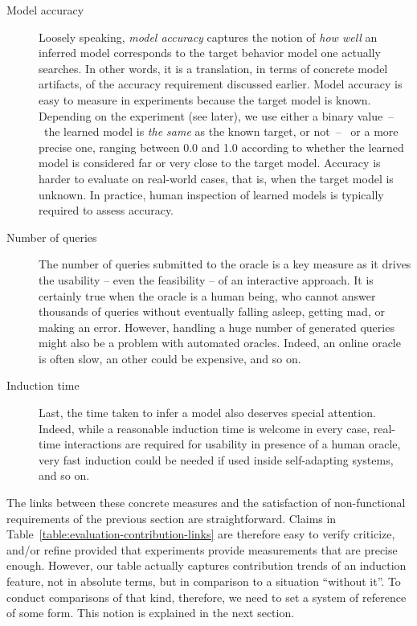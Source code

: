 \begin{description}

\item[Model accuracy] Loosely speaking, \emph{model accuracy} captures the notion of \emph{how well} an inferred model corresponds to the target behavior model one actually searches. In other words, it is a translation, in terms of concrete model artifacts, of the accuracy requirement discussed earlier. Model accuracy is easy to measure in experiments because the target model is known. Depending on the experiment (see later), we use either a binary value~--~the learned model is \emph{the same} as the known target, or not~--~ or a more precise one, ranging between 0.0 and 1.0 according to whether the learned model is considered far or very close to the target model. Accuracy is harder to evaluate on real-world cases, that is, when the target model is unknown. In practice, human inspection of learned models is typically required to assess accuracy.

\item[Number of queries] The number of queries submitted to the oracle is a key measure as it drives the usability -- even the feasibility -- of an interactive approach. It is certainly true when the oracle is a human being, who cannot answer thousands of queries without eventually falling asleep, getting mad, or making an error. However, handling a huge number of generated queries might also be a problem with automated oracles. Indeed, an online oracle is often slow, an other could be expensive, and so on.

\item[Induction time] Last, the time taken to infer a model also deserves special attention. Indeed, while a reasonable induction time is welcome in every case, real-time interactions are required for usability in presence of a human oracle, very fast induction could be needed if used inside self-adapting systems, and so on.

\end{description}

The links between these concrete measures and the satisfaction of non-functional requirements of the previous section are straightforward. Claims in Table~\ref{table:evaluation-contribution-links} are therefore easy to verify criticize, and/or refine provided that experiments provide measurements that are precise enough. However, our table actually captures contribution trends of an induction feature, not in absolute terms, but in comparison to a situation ``without it''. To conduct comparisons of that kind, therefore, we need to set a system of reference of some form. This notion is explained in the next section. 

